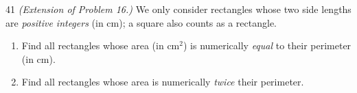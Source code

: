 \providecommand{\tbGrid}[4]{\begin{tikzpicture}[baseline=0.2cm,x=0.5cm,y=0.5cm]
  \draw[Ink,line width=0.7pt] (0,0) grid[step=1] (2,2);
  \node[font=\sffamily\bfseries,text=tmBlue!80!black,inner sep=0pt,#4] at (#1,#2) {#3};\end{tikzpicture}}
\providecommand{\rvbbG}[6]{\draw[Ink,line width=0.7pt] (#1,#2) rectangle ++(1,1)
  ({#1+0.5},#2)--++(0,1) (#1,{#2+0.5})--++(1,0);
  \node[font=\sffamily\bfseries,text=tmBlue!80!black,inner sep=0pt,#6] at ({#1+#3},{#2+#4}) {#5};}

\begin{probbox}{41}{}
\textit{(Extension of Problem 16.)} We only consider rectangles whose two side lengths are \emph{positive
integers} (in cm); a square also counts as a rectangle.
\begin{enumerate}[label=\alph*),leftmargin=1.6em,itemsep=1pt]
\item Find all rectangles whose area (in cm$^2$) is numerically \emph{equal} to their perimeter (in cm).
\item Find all rectangles whose area is numerically \emph{twice} their perimeter.
\end{enumerate}
\end{probbox}
